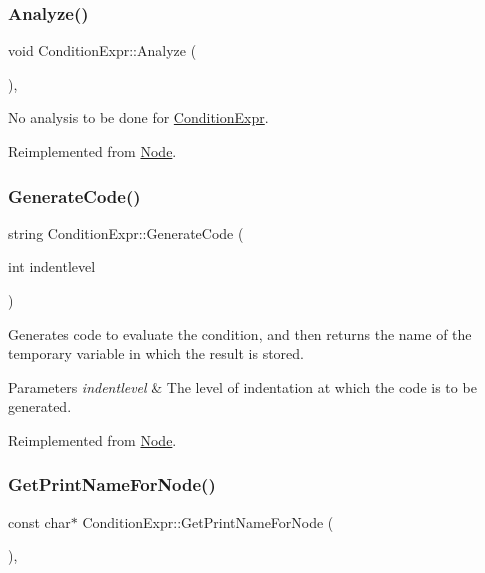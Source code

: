 \subsubsection{\texorpdfstring{Analyze()}{Analyze()}}
{\footnotesize\ttfamily void Condition\+Expr\+::\+Analyze (\begin{DoxyParamCaption}{ }\end{DoxyParamCaption})\hspace{0.3cm}{\ttfamily [inline]}, {\ttfamily [virtual]}}

No analysis to be done for \hyperlink{class_condition_expr}{Condition\+Expr}. 

Reimplemented from \hyperlink{class_node_a5f88d55c6f253a29def7ccc443d83d47}{Node}.

\mbox{\label{class_condition_expr_aaf08642ee65c2cb3a566a3bfac14e3a4}} 
\subsubsection{\texorpdfstring{Generate\+Code()}{GenerateCode()}}
{\footnotesize\ttfamily string Condition\+Expr\+::\+Generate\+Code (\begin{DoxyParamCaption}\item[{int}]{indentlevel }\end{DoxyParamCaption})\hspace{0.3cm}{\ttfamily [virtual]}}

Generates code to evaluate the condition, and then returns the name of the temporary variable in which the result is stored. 
\begin{DoxyParams}{Parameters}
{\em indentlevel} & The level of indentation at which the code is to be generated. \\
\hline
\end{DoxyParams}


Reimplemented from \hyperlink{class_node_acb60e526730e8436056375a3055c2c32}{Node}.

\mbox{\label{class_condition_expr_a557c885f6f859e0d3757ef7e50170896}} 
\subsubsection{\texorpdfstring{Get\+Print\+Name\+For\+Node()}{GetPrintNameForNode()}}
{\footnotesize\ttfamily const char$\ast$ Condition\+Expr\+::\+Get\+Print\+Name\+For\+Node (\begin{DoxyParamCaption}{ }\end{DoxyParamCaption})\hspace{0.3cm}{\ttfamily [inline]}, {\ttfamily [virtual]}}

